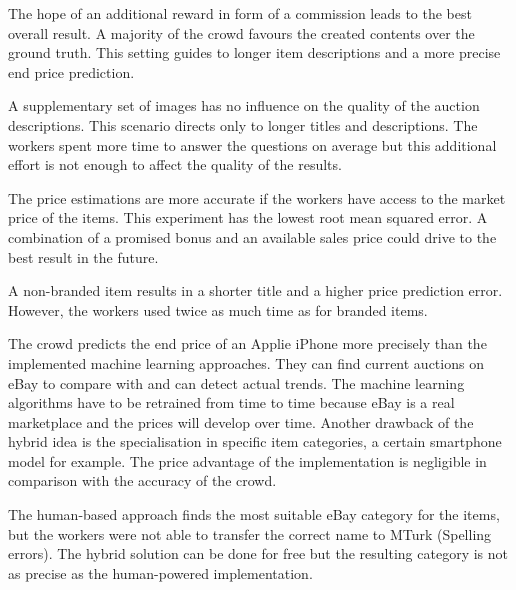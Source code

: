 The hope of an additional reward in form of a commission leads to the best overall result. A majority of the crowd favours the created contents over the ground truth. This setting guides to longer item descriptions and a more precise end price prediction.

A supplementary set of images has no influence on the quality of the auction descriptions. This scenario directs only to longer titles and descriptions. The workers spent more time to answer the questions on average but this additional effort is not enough to affect the quality of the results.

The price estimations are more accurate if the workers have access to the market price of the items. This experiment has the lowest root mean squared error. A combination of a promised bonus and an available sales price could drive to the best result in the future.

A non-branded item results in a shorter title and a higher price prediction error. However, the workers used twice as much time as for branded items.

The crowd predicts the end price of an Applie iPhone more precisely than the implemented machine learning approaches. They can find current auctions on eBay to compare with and can detect actual trends. The machine learning algorithms have to be retrained from time to time because eBay is a real marketplace and the prices will develop over time. Another drawback of the hybrid idea is the specialisation in specific item categories, a certain smartphone model for example. The price advantage of the implementation is negligible in comparison with the accuracy of the crowd.

The human-based approach finds the most suitable eBay category for the items, but the workers were not able to transfer the correct name to MTurk (Spelling errors). The hybrid solution can be done for free but the resulting category is not as precise as the human-powered implementation.
